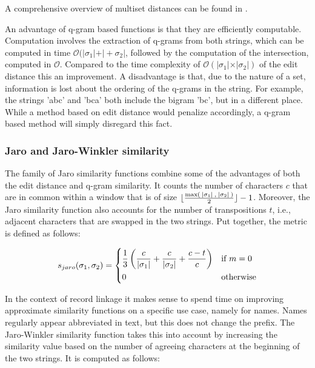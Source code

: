 \documentclass[paper=a4, fontsize=11pt]{scrartcl}
\begin{document}
\noindent A comprehensive overview of multiset distances can be found in \cite{kosters08}.

An advantage of q-gram based functions is that they are efficiently computable.
Computation involves the extraction of q-grams from both strings, which can be computed in time $\mathcal{O}(\vert \sigma_1 \vert + \vert + \sigma_2 \vert$, followed by the computation of the intersection, computed in $\mathcal{O}$.
Compared to the time complexity of $\mathcal{O}(\vert \sigma_1 \vert \times \vert \sigma_2 \vert)$ of the edit distance this an improvement.
A disadvantage is that, due to the nature of a set, information is lost about the ordering of the q-grams in the string.
For example, the strings 'abc' and 'bca' both include the bigram 'bc', but in a different place.
While a method based on edit distance would penalize accordingly, a q-gram based method will simply disregard this fact.

\subsubsection{Jaro and Jaro-Winkler similarity}
\label{sec:jaro}
The family of Jaro similarity functions combine some of the advantages of both the edit distance and q-gram similarity.
It counts the number of characters $c$ that are in common within a window that is of size $\lfloor \frac{\text{max}(\:\vert {\sigma_1} \vert\:, \:\vert {\sigma_2} \vert\:)}{2}\rfloor-1$.
Moreover, the Jaro similarity function also accounts for the number of transpositions $t$, i.e., adjacent characters that are swapped in the two strings.
Put together, the metric is defined as follows:

\begin{equation}
    s_{jaro}(\sigma_1, \sigma_2) =
    \begin{dcases}
        \frac{1}{3} \left( \frac{c}{\vert \sigma_1 \vert} + \frac{c}{\vert \sigma_2 \vert} + \frac{c-t}{c} \right) & \text{if } m = 0 \\
        0 & \text{otherwise}
    \end{dcases}
\end{equation}

In the context of record linkage it makes sense to spend time on improving approximate similarity functions on a specific use case, namely for names.
Names regularly appear abbreviated in text, but this does not change the prefix.
The Jaro-Winkler similarity function takes this into account by increasing the similarity value based on the number of agreeing characters at the beginning of the two strings.
It is computed as follows:
\end{document}
